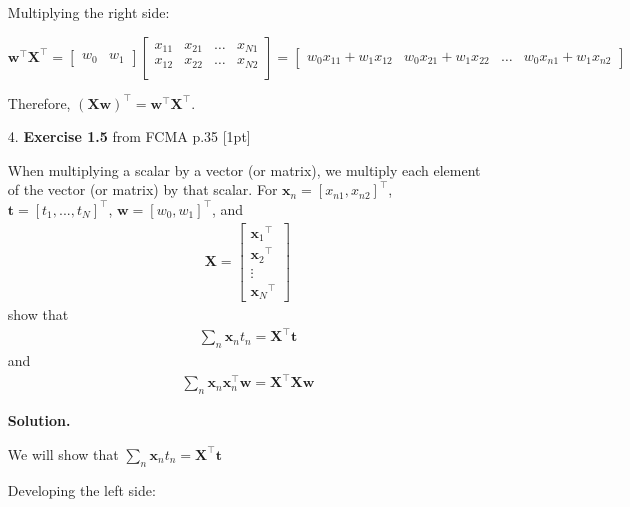 \documentclass[10pt]{article}
\begin{document}
\begin{enumerate}
Multiplying the right side:

${\mathbf{w}}^\top{\mathbf{X}}^\top = 
\begin{bmatrix}
w_{0} & w_{1}
\end{bmatrix} 
\begin{bmatrix}
x_{11} & x_{21} & \hdots  & x_{N1}\\[0.1em]
x_{12} & x_{22} & \hdots & x_{N2}\\[0.1em]
\end{bmatrix}
=
 \begin{bmatrix}
    w_{0}x_{11} + w_{1}x_{12} &  w_{0}x_{21} + w_{1}x_{22} & \hdots &   w_{0}x_{n1} + w_{1}x_{n2}  
    \end{bmatrix}   


$

Therefore, ${(\mathbf{X}\mathbf{w})}^\top = {\mathbf{w}}^\top{\mathbf{X}}^\top$.


\item[4.]
{\bf Exercise 1.5} from FCMA p.35  [1pt]

When multiplying a scalar by a vector (or matrix), we multiply each element of the vector (or matrix) by that scalar.  For $\mathbf{x}_n = {[ x_{n1}, x_{n2} ]}^\top$, $\mathbf{t} = {[ t_1,...,t_N ]}^\top$, $\mathbf{w} = {[ w_0, w_1 ]}^\top$, and
\begin{eqnarray*}
\mathbf{X} = 
    \begin{bmatrix}
    {\mathbf{x}_{1}}^\top \\[0.3em]
    {\mathbf{x}_{2}}^\top \\[0.3em]
    \vdots \\[0.3em]
    {\mathbf{x}_{N}}^\top
    \end{bmatrix}
\end{eqnarray*}
show that
\begin{eqnarray*}
\sum_{n} \mathbf{x}_n t_n = \mathbf{X}^\top\mathbf{t}
\end{eqnarray*}
and
\begin{eqnarray*}
\sum_{n} \mathbf{x}_n \mathbf{x}_n ^\top \mathbf{w} = \mathbf{X}^\top\mathbf{X} \mathbf{w}
\end{eqnarray*}

{\bf Solution.} 

We will show that $\sum_{n} \mathbf{x}_n t_n = \mathbf{X}^\top\mathbf{t}$

Developing the left side:


\end{enumerate}
\end{document}
